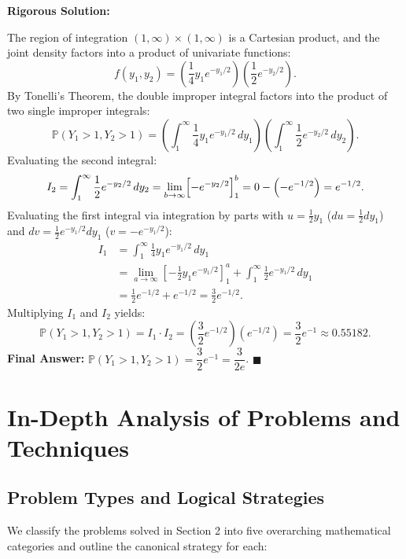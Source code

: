 \documentclass[11pt, letterpaper]{article}
\theoremstyle{definition}
\theoremstyle{remark}
\begin{document}
\textbf{Rigorous Solution:}

The region of integration $(1, \infty) \times (1, \infty)$ is a Cartesian product, and the joint density factors into a product of univariate functions:
\[
    f(y_1, y_2) = \left( \frac{1}{4} y_1 e^{-y_1/2} \right) \left( \frac{1}{2} e^{-y_2/2} \right).
\]
By Tonelli's Theorem, the double improper integral factors into the product of two single improper integrals:
\[
    \mathbb{P}(Y_1 > 1, Y_2 > 1) = \left( \int_{1}^{\infty} \frac{1}{4} y_1 e^{-y_1/2} \, dy_1 \right) \left( \int_{1}^{\infty} \frac{1}{2} e^{-y_2/2} \, dy_2 \right).
\]
Evaluating the second integral:
\[
    I_2 = \int_{1}^{\infty} \frac{1}{2} e^{-y_2/2} \, dy_2 = \lim_{b \to \infty} \Bigl[ -e^{-y_2/2} \Bigr]_{1}^{b} = 0 - \left(-e^{-1/2}\right) = e^{-1/2}.
\]
Evaluating the first integral via integration by parts with $u = \frac{1}{2} y_1$ ($du = \frac{1}{2} dy_1$) and $dv = \frac{1}{2} e^{-y_1/2} dy_1$ ($v = -e^{-y_1/2}$):
\begin{align*}
    I_1 &= \int_{1}^{\infty} \frac{1}{4} y_1 e^{-y_1/2} \, dy_1 \\
    &= \lim_{a \to \infty} \left[ -\frac{1}{2} y_1 e^{-y_1/2} \right]_{1}^{a} + \int_{1}^{\infty} \frac{1}{2} e^{-y_1/2} \, dy_1 \\
    &= \frac{1}{2} e^{-1/2} + e^{-1/2} = \frac{3}{2} e^{-1/2}.
\end{align*}
Multiplying $I_1$ and $I_2$ yields:
\[
    \mathbb{P}(Y_1 > 1, Y_2 > 1) = I_1 \cdot I_2 = \left( \frac{3}{2} e^{-1/2} \right) \left( e^{-1/2} \right) = \frac{3}{2} e^{-1} \approx 0.55182.
\]
\textbf{Final Answer:} $\mathbb{P}(Y_1 > 1, Y_2 > 1) = \dfrac{3}{2} e^{-1} = \dfrac{3}{2e}$. $\blacksquare$

\newpage

\section{In-Depth Analysis of Problems and Techniques}

\subsection{Problem Types and Logical Strategies}

We classify the problems solved in Section 2 into five overarching mathematical categories and outline the canonical strategy for each:
\end{document}

